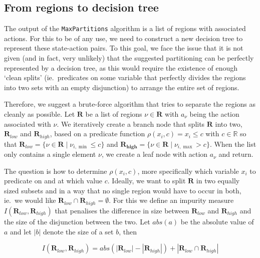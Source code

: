\subsection{From regions to decision tree}%
\label{sub:regionsToDT}

The output of the \texttt{MaxPartitions} algorithm is a list of regions with
associated actions. For this to be of any use, we need to construct a new
decision tree to represent these state-action pairs. To this goal, we face the
issue that it is not given (and in fact, very unlikely) that the suggested
partitioning can be perfectly represented by a decision tree, as this would
require the existence of enough `clean splits' (ie.\ predicates on some variable
that perfectly divides the regions into two sets with an empty disjunction) to
arrange the entire set of regions.

Therefore, we suggest a brute-force algorithm that tries to separate the regions
as cleanly as possible. Let $\mathbf{R}$ be a list of regions $\nu \in
\mathbf{R}$ with $a_{\nu}$ being the action associated with $\nu$. We
iteratively create a branch node that splits $\mathbf{R}$ into two,
$\mathbf{R}_{low}$ and $\mathbf{R}_{high}$, based on a predicate function
$\rho(x_i,c) = x_i \le c$ with $c \in \mathbb{R}$ so that $\mathbf{R}_{low} = \{
\nu \in \mathbf{R} \mid \nu_{i,\min} \le c \}$ and $\mathbf{R_{high}} = \{ \nu
\in \mathbf{R} \mid \nu_{i,\max} > c \}$. When the list only contains a single
element $\nu$, we create a leaf node with action $a_{\nu}$ and return.

The question is how to determine $\rho(x_i,c)$, more specifically which variable
$x_i$ to predicate on and at which value $c$. Ideally, we want to split
$\mathbf{R}$ in two equally sized subsets and in a way that no single region
would have to occur in both, ie.\ we would like $\mathbf{R}_{low} \cap
\mathbf{R}_{high} = \emptyset$. For this we define an impurity measure
$I(\mathbf{R}_{low},\mathbf{R}_{high})$ that penalises the difference in size
between $\mathbf{R}_{low}$ and $\mathbf{R}_{high}$ and the size of the
disjunction between the two. Let $abs(a)$ be the absolute value of $a$ and let
$|b|$ denote the size of a set $b$, then

\[
    I(\mathbf{R}_{low}, \mathbf{R}_{high})  = abs(|\mathbf{R}_{low}| -
    |\mathbf{R}_{high}|) + |\mathbf{R}_{low} \cap \mathbf{R}_{high}|
\]


